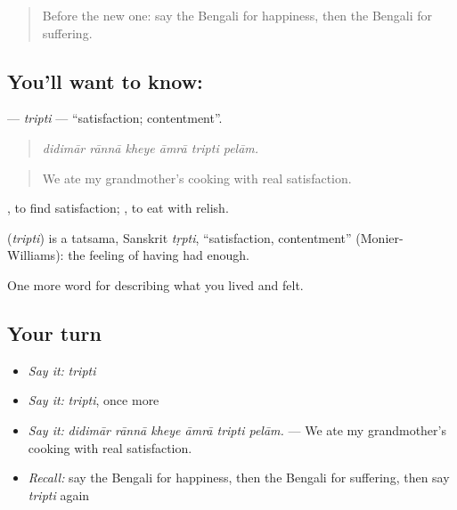 \label{lesson:BN-C439-tripti}



\begin{quote}
Before the new one: say the Bengali for happiness, then the Bengali for suffering.
\end{quote}

\subsection*{You'll want to know: }
\textbf{} — \emph{tripti} — \textquotedblleft{}satisfaction; contentment\textquotedblright{}.

\begin{quote}
     
\end{quote}

\begin{quote}
\emph{didimār rānnā kheye āmrā tripti pelām.}
\end{quote}

\begin{quote}
We ate my grandmother's cooking with real satisfaction.
\end{quote}

 , to find satisfaction;   , to eat with relish.

\begin{cousinweb}
\textbf{} (\emph{tripti}) is a tatsama, Sanskrit \emph{tṛpti}, \textquotedblleft{}satisfaction, contentment\textquotedblright{} (Monier-Williams): the feeling of having had enough.
\end{cousinweb}

\begin{grammarlens}[title={What you've built}]
One more word for describing what you lived and felt.
\end{grammarlens}

\subsection*{Your turn}
\begin{itemize}
\raggedright
  \item \emph{Say it:} \emph{tripti}
  \item \emph{Say it:} \emph{tripti}, once more
  \item \emph{Say it:} \emph{didimār rānnā kheye āmrā tripti pelām.} — We ate my grandmother's cooking with real satisfaction.
  \item \emph{Recall:} say the Bengali for happiness, then the Bengali for suffering, then say \emph{tripti} again
\end{itemize}

